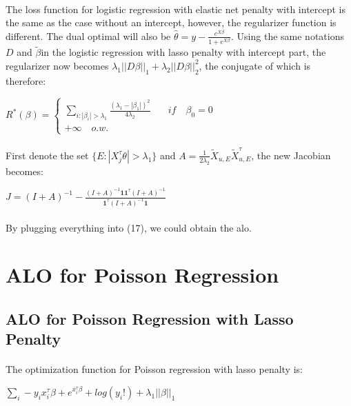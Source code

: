 \documentclass{article}
\begin{document}
\paragraph{}The loss function for logistic regression with elastic net penalty with intercept is the same as the case without an intercept, however, the regularizer function is different. The dual optimal will also be $\hat{\theta} = y - \frac{e^{X\beta}}{1+e^{X\beta}}$. Using the same notations $D$ and $\tilde{\beta}$in the logistic regression with lasso penalty with intercept part, the regularizer now becomes $\lambda_{1}||D\beta||_{1}+\lambda_{2}||D\beta||_{2}^{2}$, the conjugate of which is therefore:
\begin{center}
$R^{*}(\beta) = \left\{
\begin{aligned}
\sum\limits_{i:|\beta_{i}|>\lambda_{1}}\frac{(\lambda_{1}-|\beta_{1}|)^{2}}{4\lambda_{2}} &\quad if \quad \beta_{0}=0\\
+\infty \quad o.w.
\end{aligned}
\right.$
\end{center}
\paragraph{}First denote the set $\{E:|X_{j}^{\tau}\theta| > \lambda_{1}\}$ and $A = \frac{1}{2\lambda_{2}}\tilde{X}_{u,E}\tilde{X}_{u,E}^{\tau}$, the new Jacobian becomes: 
\begin{center}
$J = (I+A)^{-1}-\frac{(I+A)^{-1}\textbf{1}\textbf{1}^{\tau}(I+A)^{-1}}{\textbf{1}^{\tau}(I+A)^{-1}\textbf{1}}$
\end{center}
\paragraph{}By plugging everything into (17), we could obtain the alo.
\section{ALO for Poisson Regression}
\subsection{ALO for Poisson Regression with Lasso Penalty}
\paragraph{}The optimization function for Poisson regression with lasso penalty is:
\begin{center}
$\sum\limits_{i}-y_{i}x_{i}^{\tau}\beta+e^{x_{i}^{\tau}\beta}+log(y_{i}!) + \lambda_{1}||\beta||_{1}$
\end{center}
\end{document}
